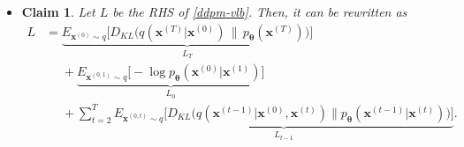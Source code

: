 \documentclass[10pt]{article}
\newtheorem{claim}[lemma]{Claim}
\newcommand{\ve}[1]{\mathbf{#1}}
\newcommand{\ves}[1]{\boldsymbol{#1}}
\begin{document}
\begin{itemize}
\begin{proof}
  \begin{align*}    
    E_{\ve{x}^{(0)} \sim q} [-\log p_{\ves{\theta}}(\ve{x}^{(0)})]
    &= E_{\ve{x}^{(0)} \sim q} \bigg[ -\log \bigg( E_{\ve{x}^{(1:T)} \sim q(\ve{x}^{(1:T)}|\ve{x}^{(0)})} \bigg[ p_{\ves{\theta}}(\ve{x}^{(T)}) \prod_{t=1}^T \frac{ p_{\ves{\theta}}(\ve{x}^{(t-1)}|\ve{x}^{(t)})}{ q(\ve{x}^{(t)}|\ve{x}^{(t-1)})} \bigg] \bigg) \bigg] \\
    &\leq E_{\ve{x}^{(0)} \sim q} \bigg[ - E_{\ve{x}^{(1:T)} \sim q(\ve{x}^{(1:T)}|\ve{x}^{(0)})} \bigg[ \log \bigg( p_{\ves{\theta}}(\ve{x}^{(T)}) \prod_{t=1}^T \frac{ p_{\ves{\theta}}(\ve{x}^{(t-1)}|\ve{x}^{(t)})}{ q(\ve{x}^{(t)}|\ve{x}^{(t-1)})} \bigg) \bigg] \bigg] \\
    &= - E_{\ve{x}^{(0:T)}\sim q}\bigg[ \log p_{\ves{\theta}}(\ve{x}^{(T)}) + \sum_{t=1}^T \log p_{\ves{\theta}}(\ve{x}^{(t-1)}|\ve{x}^{(t)}) - \sum_{t=1}^T \log q(\ve{x}^{(t)}|\ve{x}^{(t-1)}) \bigg] \\
    &= E_{\ve{x}^{(0:T)}\sim q}\bigg[ \sum_{t=1}^T \log q(\ve{x}^{(t)}|\ve{x}^{(t-1)}) - \log p_{\ves{\theta}}(\ve{x}^{(T)}) - \sum_{t=1}^T \log p_{\ves{\theta}}(\ve{x}^{(t-1)}|\ve{x}^{(t)}) \bigg] \\
    &= E_{\ve{x}^{(0:T)} \sim q}\Big[ \log q(\ve{x}^{(1:T)}|\ve{x}^{(0)}) - \log p_{\ves{\theta}}(\ve{x}^{(0:T)}) \Big]
  \end{align*}
  as required.
\end{proof}

\item \begin{claim} \label{ddpm-vlb-three-terms}
Let $L$ be the RHS of \eqref{ddpm-vlb}. Then, it can be rewritten as
\begin{align*}
  L
  &= \underbrace{E_{\ve{x}^{(0)} \sim q} \Big[ D_{KL}\big(q(\ve{x}^{(T)}|\ve{x}^{(0)})\, \big\|\, p_{\ves{\theta}}(\ve{x}^{(T)})\big) \Big]}_{L_T} \\
  &\phantom{=} + \underbrace{E_{\ve{x}^{(0,1)} \sim q} \bigg[ - \log p_{\ves{\theta}}(\ve{x}^{(0)}|\ve{x}^{(1)}) \bigg] }_{L_0} \\
  &\phantom{=} + \sum_{t = 2}^T \underbrace{E_{\ve{x}^{(0,t)}\sim q} \Big[ D_{KL}\big( q(\ve{x}^{(t-1)}|\ve{x}^{(0)},\ve{x}^{(t)})  \big\| p_{\ves{\theta}}(\ve{x}^{(t-1)}|\ve{x}^{(t)}) \big) \Big]}_{L_{t-1}}.
\end{align*}
\end{claim}


\end{itemize}
\end{document}
